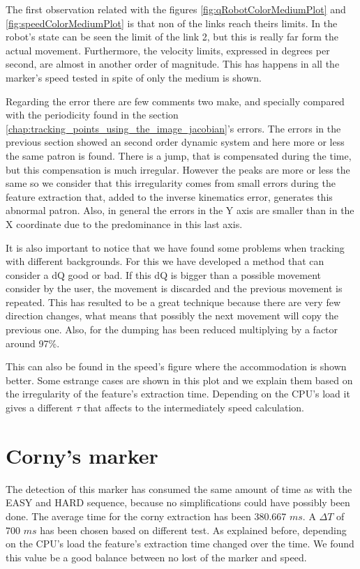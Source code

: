 		\ifx \plots \yes
			\qRobotColorMediumPlot
		\fi

		\ifx \plots \yes
			\speedColorMediumPlot
		\fi

		\ifx \plots \yes
			\errorColorPlot
		\fi

		The first observation related with the figures \ref{fig:qRobotColorMediumPlot} and \ref{fig:speedColorMediumPlot} is that non of the links reach theirs limits. 
		In the robot's state can be seen the limit of the link 2, but this is really far form the actual movement. 
		Furthermore, the velocity limits, expressed in degrees per second, are almost in another order of magnitude. This has happens in all the marker's speed tested in spite of only the medium is shown.

		Regarding the error there are few comments two make, and specially compared with the periodicity found in the section \ref{chap:tracking_points_using_the_image_jacobian}'s errors. 
		The errors in the previous section showed an second order dynamic system and here more or less the same patron is found. 
		There is a jump, that is compensated during the time, but this compensation is much irregular. 
		However the peaks are more or less the same so we consider that this irregularity comes from small errors during the feature extraction that, added to the inverse kinematics error, generates this abnormal patron. 
		Also, in general the errors in the Y axis are smaller than in the X coordinate due to the predominance in this last axis.

		It is also important to notice that we have found some problems when tracking with different backgrounds. 
		For this we have developed a method that can consider a dQ good or bad. 
		If this dQ is bigger than a possible movement consider by the user, the movement is discarded and the previous movement is repeated. 
		This has resulted to be a great technique because there are very few direction changes, what means that possibly the next movement will copy the previous one. Also, for the dumping has been reduced multiplying by a factor around 97\%.

		This can also be found in the speed's figure where the accommodation is shown better. 
		Some estrange cases are shown in this plot and we explain them based on the irregularity of the feature's extraction time. 
		Depending on the CPU's load it gives a different $\tau$ that affects to the intermediately speed calculation.

	\section{Corny's marker} %
	\label{sec:corny_s_marker}
	The detection of this marker has consumed the same amount of time as with the EASY and HARD sequence, because no simplifications could have possibly been done. 
		The average time for the corny extraction has been 380.667 $ms$. A $\Delta T$ of 700 $ms$ has been chosen based on different test. 
		As explained before, depending on the CPU's load the feature's extraction time changed over the time.
		We found this value be a good balance between no lost of the marker and speed.

